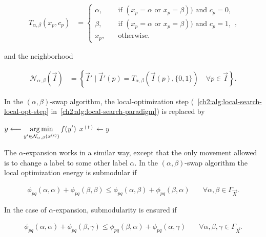 \begin{align*}
	T_{\alpha,\beta}(x_p,c_p) &= \left\{ \begin{array}{rl}
		\alpha,& \quad \text{if } ( x_p=\alpha \text{ or } x_p=\beta) ) \text{ and } c_p=0,\\[1em]
		\beta,& \quad \text{if } ( x_p=\alpha \text{ or } x_p=\beta) ) \text{ and } c_p=1,\\[1em]
		x_p,& \quad \text{otherwise}.
	\end{array}\right. ,
\end{align*}

and the neighborhood

\begin{align*}
\mathcal{N}_{\alpha,\beta}(\vec{I}) &= \left\{ \vec{I}' \; | \; \vec{I}'(p) = T_{\alpha,\beta}(\vec{I}(p),\{0,1\}) \quad \forall p \in \vec{I} \right\}.
\end{align*}


In the $(\alpha,\beta)$-swap algorithm, the local-optimization step (~\cref{ch2:alg:local-search-local-opt-step} in~\cref{ch2:alg:local-search-paradigm}) is replaced by

\begin{algorithm}[H]
  \BlankLine
  
 	{
	 	$y \longleftarrow \displaystyle \operatorname*{arg\,min}_{ y' \in \mathcal{N}_{\alpha,\beta}(x^{(t)})} f(y')$\;
	 	{
	 		$x^{(t)} \longleftarrow y$\;
	 	}
 	}
 	
 \BlankLine
\end{algorithm}

The $\alpha$-expansion works in a similar way, except that the only movement allowed is to change a label to some other label $\alpha$. In the $(\alpha,\beta)$-swap algorithm the local optimization energy is submodular if

\begin{align}
	\phi_{pq}(\alpha,\alpha) + \phi_{pq}(\beta,\beta) \leq \phi_{pq}(\alpha,\beta) + \phi_{pq}(\beta,\alpha) & \quad \forall \alpha,\beta \in \Gamma_{\vec{X}}.
	\label{ch2:eq:multilabeling-metric}
\end{align}

In the case of $\alpha$-expansion, submodularity is ensured if

\begin{align}
	\phi_{pq}(\alpha,\alpha) + \phi_{pq}(\beta,\gamma) \leq \phi_{pq}(\beta,\alpha) + \phi_{pq}(\alpha,\gamma) & \quad \forall \alpha,\beta,\gamma \in \Gamma_{\vec{X}}.
	\label{ch2:eq:multilabeling-semi-metric}	
\end{align}

